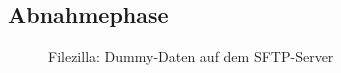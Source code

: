 \subsection{Abnahmephase}
\label{app:Abnahmephase}
\begin{figure}[htb]
\centering
{}
\caption{Filezilla: Dummy-Daten auf dem SFTP-Server}
\end{figure}
\clearpage